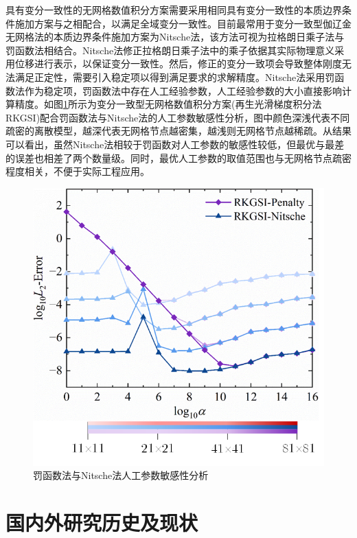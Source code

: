 具有变分一致性的无网格数值积分方案需要采用相同具有变分一致性的本质边界条件施加方案与之相配合，以满足全域变分一致性\cite{wang2016}。目前最常用于变分一致型伽辽金无网格法的本质边界条件施加方案为Nitsche法，该方法可视为拉格朗日乘子法与罚函数法相结合。Nitsche法修正拉格朗日乘子法中的乘子依据其实际物理意义采用位移进行表示，以保证变分一致性。然后，修正的变分一致项会导致整体刚度无法满足正定性，需要引入稳定项以得到满足要求的求解精度。Nitsche法采用罚函数法作为稳定项，罚函数法中存在人工经验参数，人工经验参数的大小直接影响计算精度。如图\ref{nitschepenalty}所示为变分一致型无网格数值积分方案(再生光滑梯度积分法RKGSI)配合罚函数法与Nitsche法的人工参数敏感性分析，图中颜色深浅代表不同疏密的离散模型，越深代表无网格节点越密集，越浅则无网格节点越稀疏。从结果可以看出，虽然Nitsche法相较于罚函数对人工参数的敏感性较低，但最优与最差的误差也相差了两个数量级。同时，最优人工参数的取值范围也与无网格节点疏密程度相关，不便于实际工程应用。

\begin{figure}[ht!]
\centering
    \includegraphics[scale=0.9]{figure/fig1.png}
    \caption{罚函数法与Nitsche法人工参数敏感性分析}\label{nitschepenalty}
\end{figure}

\section{国内外研究历史及现状}


